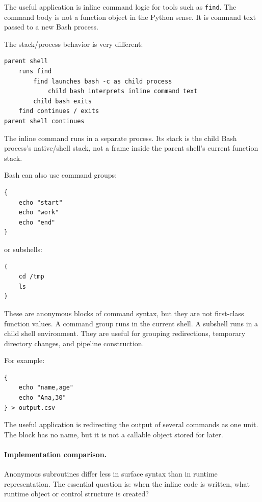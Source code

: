 \documentclass[a4paper,twoside]{report}
\begin{document}
The useful application is inline command logic for tools such as \texttt{find}. The command body is not a function object in the Python sense. It is command text passed to a new Bash process.

The stack/process behavior is very different:

\begin{verbatim}
parent shell
    runs find
        find launches bash -c as child process
            child bash interprets inline command text
        child bash exits
    find continues / exits
parent shell continues
\end{verbatim}

The inline command runs in a separate process. Its stack is the child Bash process's native/shell stack, not a frame inside the parent shell's current function stack.

Bash can also use command groups:

\begin{verbatim}
{
    echo "start"
    echo "work"
    echo "end"
}
\end{verbatim}

or subshells:

\begin{verbatim}
(
    cd /tmp
    ls
)
\end{verbatim}

These are anonymous blocks of command syntax, but they are not first-class function values. A command group runs in the current shell. A subshell runs in a child shell environment. They are useful for grouping redirections, temporary directory changes, and pipeline construction.

For example:

\begin{verbatim}
{
    echo "name,age"
    echo "Ana,30"
} > output.csv
\end{verbatim}

The useful application is redirecting the output of several commands as one unit. The block has no name, but it is not a callable object stored for later.

\paragraph{Implementation comparison.}

Anonymous subroutines differ less in surface syntax than in runtime representation. The essential question is: when the inline code is written, what runtime object or control structure is created?
\end{document}
